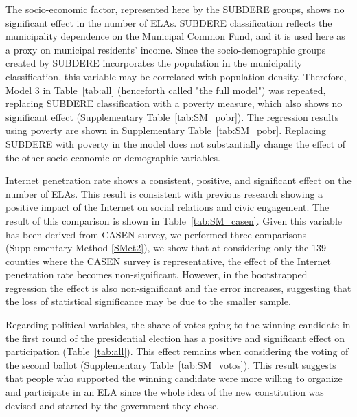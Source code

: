 \documentclass[onecolumn]{article}
\begin{document}
The socio-economic factor, represented here by the SUBDERE groups, shows no significant effect in the number of ELAs. SUBDERE classification reflects the municipality dependence on the Municipal Common Fund, and it is used here as a proxy on municipal residents' income.  Since the socio-demographic groups created by SUBDERE incorporates the population in the municipality classification, this variable may be correlated with population density. Therefore, Model 3 in Table~\ref{tab:all} (henceforth called "the full model") was repeated, replacing SUBDERE classification with a poverty measure, which also shows no significant effect (Supplementary Table~\ref{tab:SM_pobr}). %
The regression results using poverty are shown in Supplementary Table~\ref{tab:SM_pobr}. Replacing SUBDERE with poverty in the model does not substantially change the effect of the other socio-economic or demographic variables. 



Internet penetration rate shows a consistent, positive, and significant effect on the number of ELAs. This result is consistent with previous research showing a positive impact of the Internet on social relations and civic engagement. The result of this comparison is shown in Table~\ref{tab:SM_casen}.  Given this variable has been derived from CASEN survey, we performed three comparisons (Supplementary Method \ref{SMet2}), we show that at considering only the 139 counties where the CASEN survey is representative, the effect of the Internet penetration rate becomes non-significant. However, in the bootstrapped regression the effect is also non-significant and the error increases, suggesting that the loss of statistical significance may be due to the smaller sample.



Regarding political variables, the share of votes going to the winning candidate in the first round of the presidential election has a positive and significant effect on participation (Table~\ref{tab:all}). This effect remains when considering the voting of the second ballot (Supplementary Table~\ref{tab:SM_votos}). This result suggests that people who supported the winning candidate were more willing to organize and participate in an ELA since the whole idea of the new constitution was devised and started by the government they chose. 
\end{document}
